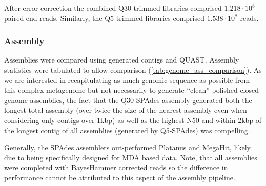 After error correction the combined Q30 trimmed libraries comprised
\(1.218\cdot10^{8}\) paired end reads.  Similarly, the Q5 trimmed
libraries comprised \(1.538\cdot10^{8}\) reads. 

\subsubsection{Assembly}

Assemblies were compared using generated contigs and QUAST.
Assembly statistics were tabulated to allow comparison (\cref{tab:genome_ass_comparison}).
As we are interested in recapitulating as much genomic sequence as possible
from this complex metagenome but not necessarily to generate ``clean''
polished closed genome assemblies, the fact that the Q30-SPAdes assembly
generated both the longest total assembly (over twice the size of the nearest
assembly even when considering only contigs over 1kbp) as well
as the highest N50 and within 2kbp of the longest contig of all assemblies (generated
by Q5-SPAdes) was compelling. 

Generally, the SPAdes assemblers out-performed Platanus and MegaHit, likely due to 
being specifically designed for MDA based data.  Note, that all assemblies 
were completed with BayesHammer corrected reads so the difference in performance
cannot be attributed to this aspect of the assembly pipeline.

